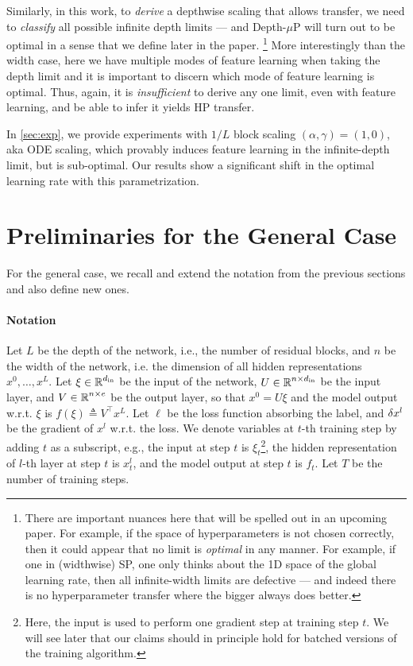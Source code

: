 \documentclass{article}
\theoremstyle{plain}
\theoremstyle{definition}
\begin{document}
Similarly, in this work, to \emph{derive} a depthwise scaling that allows transfer, we need to \emph{classify} all possible infinite depth limits --- and Depth-$\mu$P will turn out to be optimal in a sense that we define later in the paper.%
\footnote{There are important nuances here that will be spelled out in an upcoming paper. For example, if the space of hyperparameters is not chosen correctly, then it could appear that no limit is \emph{optimal} in any manner. For example, if one in (widthwise) SP, one only thinks about the 1D space of the global learning rate, then all infinite-width limits are defective --- and indeed there is no hyperparameter transfer where the bigger always does better.}
More interestingly than the width case, here we have multiple modes of feature learning when taking the depth limit and it is important to discern which mode of feature learning is optimal.
Thus, again, it is \emph{insufficient} to derive any one limit, even with feature learning, and be able to infer it yields HP transfer.

In \cref{sec:exp}, we provide experiments with $1/L$ block scaling $(\alpha, \gamma) = (1, 0)$, aka ODE scaling, which provably induces feature learning in the infinite-depth limit, but is sub-optimal. Our results show a significant shift in the optimal learning rate with this parametrization. 
\section{Preliminaries for the General Case}\label{sec:preliminaries}
For the general case, we recall and extend the notation from the previous sections and also define new ones.
\paragraph{Notation} Let $L$ be the depth of the network, i.e., the number of residual blocks, and $n$ be the width of the network, i.e. the dimension of all hidden representations $x^0, \ldots, x^L$. Let $\xi\in \boldsymbol{\mathbb{\mathbb{R}}}^{d_{\mathrm{in}}}$ be the input of the network, $U \in \boldsymbol{\mathbb{\mathbb{R}}}^{n\times {d_{\mathrm{in}}}}$ be the input layer, and $V\in \boldsymbol{\mathbb{\mathbb{R}}}^{n\times e}$ be the output layer, so that $x^0 = U\xi$ and the model output w.r.t. $\xi$ is $f(\xi)\triangleq V^\top x^L$.  Let $\ell$ be the loss function absorbing the label, and $\delta x^l$ be the gradient of $x^l$ w.r.t. the loss. 
We denote variables at $t$-th training step by adding $t$ as a subscript, e.g., the input at step $t$ is $\xi_t$\footnote{Here, the input is used to perform one gradient step at training step $t$. We will see later that our claims should in principle hold for batched versions of the training algorithm.}, the hidden representation of $l$-th layer at step $t$ is $x_t^l$, and the model output at step $t$ is $f_t$. Let $T$ be the number of training steps. 
\end{document}
